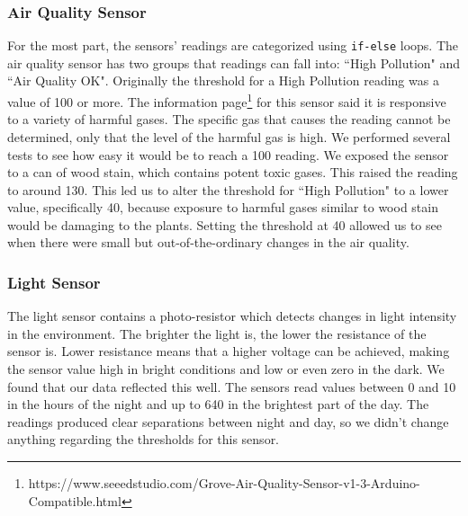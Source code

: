 \subsubsection{Air Quality Sensor}
For the most part, the sensors' readings are categorized using \texttt{if-else} loops. The air quality sensor has two groups that readings can fall into: ``High Pollution" and ``Air Quality OK". Originally the threshold for a High Pollution reading was a value of 100 or more. The information page\footnote{https://www.seeedstudio.com/Grove-Air-Quality-Sensor-v1-3-Arduino-Compatible.html} for this sensor said it is responsive to a variety of harmful gases. The specific gas that causes the reading cannot be determined, only that the level of the harmful gas is high. We performed several tests to see how easy it would be to reach a 100 reading. We exposed the sensor to a can of wood stain, which contains potent toxic gases. This raised the reading to around 130. This led us to alter the threshold for ``High Pollution" to a lower value, specifically 40, because exposure to harmful gases similar to wood stain would be damaging to the plants. Setting the threshold at 40 allowed us to see when there were small but out-of-the-ordinary changes in the air quality. 
 

\subsubsection{Light Sensor}
The light sensor contains a photo-resistor which detects changes in light intensity in the environment. The brighter the light is, the lower the resistance of the sensor is. Lower resistance means that a higher voltage can be achieved, making the sensor value high in bright conditions and low or even zero in the dark. We found that our data reflected this well. The sensors read values between 0 and 10 in the hours of the night and up to 640 in the brightest part of the day. The readings produced clear separations between night and day, so we didn't change anything regarding the thresholds for this sensor. %

